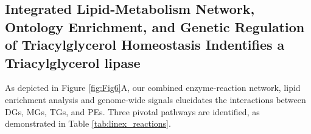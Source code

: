 \documentclass[10pt,letterpaper]{article}
\begin{document}




\subsection*{Integrated Lipid‐Metabolism Network, Ontology Enrichment, and Genetic Regulation of Triacylglycerol Homeostasis Indentifies a Triacylglycerol lipase}

As depicted in Figure \ref{fig:Fig6}A, our combined enzyme-reaction network, lipid enrichment analysis and genome-wide signals elucidates the interactions between DGs, MGs, TGs, and PEs. Three pivotal pathways are identified, as demonstrated in Table \ref{tab:linex_reactions}.
\end{document}
